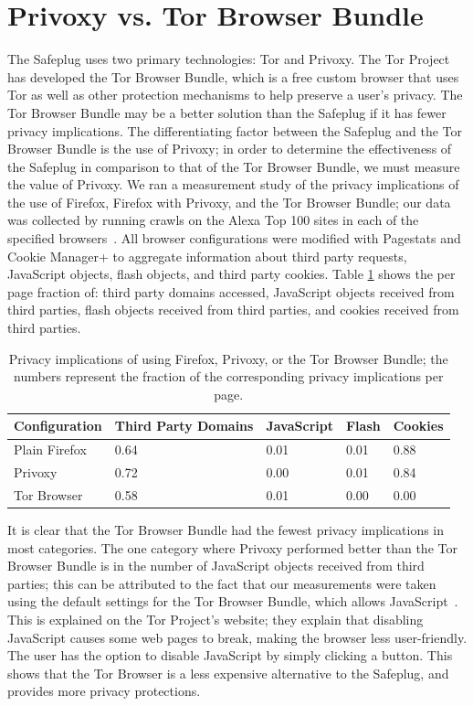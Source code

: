 \documentclass[letterpaper,twocolumn,10pt]{article}
\begin{document}
\section{Privoxy vs. Tor Browser Bundle}
The Safeplug uses two primary technologies: Tor and Privoxy.  The Tor Project has developed the Tor Browser Bundle, which is a free custom browser that uses Tor as well as other protection mechanisms to help preserve a user's privacy.  The Tor Browser Bundle may be a better solution than the Safeplug if it has fewer privacy implications.  The differentiating factor between the Safeplug and the Tor Browser Bundle is the use of Privoxy; in order to determine the effectiveness of the Safeplug in comparison to that of the Tor Browser Bundle, we must measure the value of Privoxy.  We ran a measurement study of the privacy implications of the use of Firefox, Firefox with Privoxy, and the Tor Browser Bundle; our data was collected by running crawls on the Alexa Top 100 sites in each of the specified browsers~\cite{alexa}.  All browser configurations were modified with Pagestats \cite{pagestats} and Cookie Manager+ \cite{cookiemonster} to aggregate information about third party requests, JavaScript objects, flash objects, and third party cookies.  Table \ref{tbb} shows the per page fraction of: third party domains accessed, JavaScript objects received from third parties, flash objects received from third parties, and cookies received from third parties.  

\begin{table}[!t]
\renewcommand{\arraystretch}{1.3}
\caption{Privacy implications of using Firefox, Privoxy, or the Tor Browser Bundle; the numbers represent the fraction of the corresponding privacy implications per page.}
\label{tbb}
\centering
\small
	\begin{tabular}{| p{1.85cm} | p{1.3cm} | p{1.25cm} | p{.7cm} | p{1cm} |}
	\hline
		Configuration & Third Party Domains & JavaScript & Flash & Cookies \\ \hline
		Plain Firefox	& 0.64 & 0.01 & 0.01 & 0.88 \\ \hline
		Privoxy & 0.72 & 0.00 & 0.01 & 0.84 \\ \hline
		Tor Browser	& 0.58 & 0.01 & 0.00 & 0.00 \\ \hline
	\end{tabular}
\end{table}

It is clear that the Tor Browser Bundle had the fewest privacy implications in most categories. The one category where Privoxy performed better than the Tor Browser Bundle is in the number of JavaScript objects received from third parties; this can be attributed to the fact that our measurements were taken using the default settings for the Tor Browser Bundle, which allows JavaScript~\cite{torproject}.  This is explained on the Tor Project's website; they explain that disabling JavaScript causes some web pages to break, making the browser less user-friendly.  The user has the option to disable JavaScript by simply clicking a button.  This shows that the Tor Browser is a less expensive alternative to the Safeplug, and provides more privacy protections.    
\end{document}
